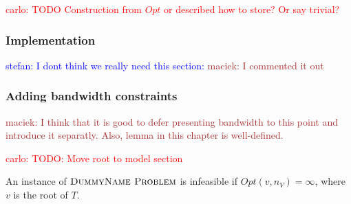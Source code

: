 \documentclass[9pt,twocolumn]{scrartcl}
\newcommand{\Problem}{\textsc{DummyName Problem}}
\newcommand{\carlo}[1]{\textcolor{red}{carlo: #1}}
\newcommand{\maciek}[1]{\textcolor{brown}{maciek: #1}}
\newcommand{\stefan}[1]{\textcolor{blue}{stefan: #1}}
\newcommand{\SubstrateNode}{\ensuremath{v}}
\newcommand{\Opt}{\ensuremath{Opt}}
\newcommand{\ChunkCount}{\ensuremath{\textsc{cis}}}
\newcommand{\VmCount}{\ensuremath{\textsc{vis}}}
\newcommand{\Tree}{\ensuremath{T}}
\newcommand{\Vms}{\ensuremath{n_V}}
\begin{document}
\begin{appendix}
\carlo{TODO Construction from $\Opt$ or described how to store? Or say trivial?}

\subsubsection{Implementation}

\stefan{I dont think we really need this section:}
\maciek{I commented it out}

\subsubsection{Adding bandwidth constraints}

\maciek{I think that it is good to defer presenting bandwidth to this point and introduce it separatly. Also, lemma in this chapter is well-defined.}

\carlo{TODO: Move root to model section}

\begin{lemma}
An instance of $\Problem$ is infeasible if $\Opt(\SubstrateNode,\Vms) = \infty$,
where $\SubstrateNode$ is the root of $\Tree$.
\end{lemma}


\end{appendix}
\end{document}
